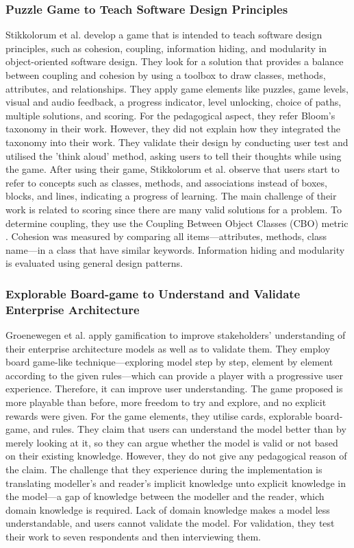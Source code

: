 \documentclass[12pt, a4paper]{report}
\begin{document}
{\subsubsection{Puzzle Game to Teach Software Design Principles}
Stikkolorum et al. \cite{Stikkolorum2014} develop a game that is intended to teach software design principles, such as cohesion, coupling, information hiding, and modularity in object-oriented software design. They look for a solution that provides a balance between coupling and cohesion by using a toolbox to draw classes, methods, attributes, and relationships. They apply game elements like puzzles, game levels, visual and audio feedback, a progress indicator, level unlocking, choice of paths, multiple solutions, and scoring. For the pedagogical aspect, they refer Bloom's taxonomy in their work. However, they did not explain how they integrated the taxonomy into their work. They validate their design by conducting user test and utilised the 'think aloud' method, asking users to tell their thoughts while using the game. After using their game, Stikkolorum et al. \cite{Stikkolorum2014} observe that users start to refer to concepts such as classes, methods, and associations instead of boxes, blocks, and lines, indicating a progress of learning. The main challenge of their work is related to scoring since there are many valid solutions for a problem. To determine coupling, they use the Coupling Between Object Classes (CBO) metric \cite{Stikkolorum2014}. Cohesion was measured by comparing all items---attributes, methods, class name---in a class that have similar keywords. Information hiding and modularity is evaluated using general design patterns. 


\subsubsection{Explorable Board-game to Understand and Validate Enterprise Architecture}
Groenewegen et al. \cite{Groenewegen2010} apply gamification to improve stakeholders' understanding of their enterprise architecture models as well as to validate them. They employ board game-like technique---exploring model step by step, element by element according to the given rules---which can provide a player with a progressive user experience. Therefore, it can improve user understanding. The game proposed is more playable than before, more freedom to try and explore, and no explicit rewards were given. For the game elements, they utilise cards, explorable board-game, and rules. They claim that users can understand the model better than by merely looking at it, so they can argue whether the model is valid or not based on their existing knowledge. However, they do not give any pedagogical reason of the claim. The challenge that they experience during the implementation is translating modeller's and reader's implicit knowledge unto explicit knowledge in the model---a gap of knowledge between the modeller and the reader, which domain knowledge is required. Lack of domain knowledge makes a model less understandable, and users cannot validate the model. For validation, they test their work to seven respondents and then interviewing them. 

}
\end{document}
